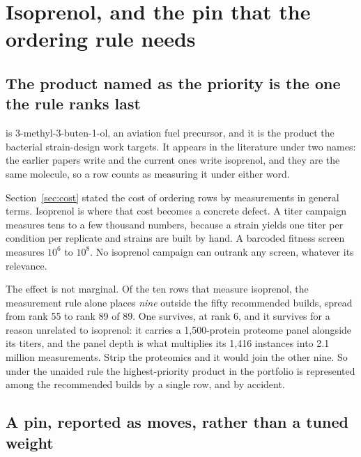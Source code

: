 
\section{Isoprenol, and the pin that the ordering rule needs}\label{sec:iso}

\subsection{The product named as the priority is the one the rule ranks last}

 is 3-methyl-3-buten-1-ol, an aviation fuel precursor, and it is the
product the bacterial strain-design work targets. It appears in the literature under two
names: the earlier papers write  and the current ones write isoprenol,
and they are the same molecule, so a row counts as measuring it under either word.

Section~\ref{sec:cost} stated the cost of ordering rows by measurements in general terms.
Isoprenol is where that cost becomes a concrete defect. A titer campaign measures tens to
a few thousand numbers, because a strain yields one titer per condition per replicate and
strains are built by hand. A barcoded fitness screen measures $10^{6}$ to $10^{8}$. No
isoprenol campaign can outrank any screen, whatever its relevance.

The effect is not marginal. Of the ten rows that measure isoprenol, the measurement rule
alone places \emph{nine} outside the fifty recommended builds, spread from rank 55 to rank
89 of 89. One survives, at rank 6, and it survives for a reason unrelated to isoprenol: it
carries a 1,500-protein proteome panel alongside its titers, and the panel depth is what
multiplies its 1,416 instances into 2.1 million measurements. Strip the proteomics and it
would join the other nine. So under the unaided rule the highest-priority product in the
portfolio is represented among the recommended builds by a single row, and by accident.

\subsection{A pin, reported as moves, rather than a tuned weight}

